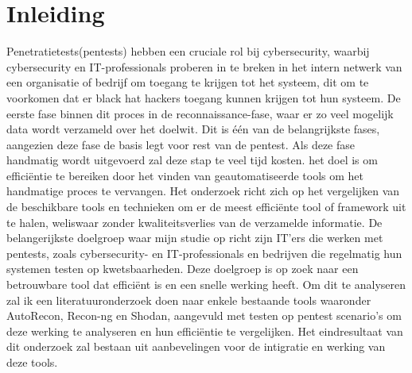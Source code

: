 


% 




\section{Inleiding}%
\label{sec:inleiding}

Penetratietests(pentests) hebben een cruciale rol bij cybersecurity, waarbij cybersecurity en IT-professionals proberen in te breken in het intern netwerk 
van een organisatie of bedrijf om toegang te krijgen tot het systeem, dit om te voorkomen dat er black hat hackers toegang kunnen krijgen tot hun systeem. 
De eerste fase binnen dit proces in de reconnaissance-fase, waar er zo veel mogelijk data wordt verzameld over het doelwit. Dit is één van de belangrijkste fases, 
aangezien deze fase de basis legt voor rest van de pentest. Als deze fase handmatig wordt uitgevoerd zal deze stap te veel tijd kosten. 
het doel is om efficiëntie te bereiken door het vinden van geautomatiseerde tools om het handmatige proces te vervangen.
Het onderzoek richt zich op het vergelijken van de beschikbare tools en technieken om er de meest efficiënte tool of framework uit te halen, weliswaar zonder kwaliteitsverlies van de verzamelde informatie.
De belangerijkste doelgroep waar mijn studie op richt zijn IT’ers die werken met pentests, zoals cybersecurity- en IT-professionals en bedrijven die regelmatig hun systemen testen op kwetsbaarheden. 
Deze doelgroep is op zoek naar een betrouwbare tool dat efficiënt is en een snelle werking heeft. 
Om dit te analyseren zal ik een literatuuronderzoek doen naar enkele bestaande tools waaronder 
AutoRecon, Recon-ng en Shodan, aangevuld met testen op pentest scenario’s om deze werking te analyseren en hun efficiëntie te vergelijken. 
Het eindresultaat van dit onderzoek zal bestaan uit aanbevelingen voor de intigratie en werking van deze tools.


